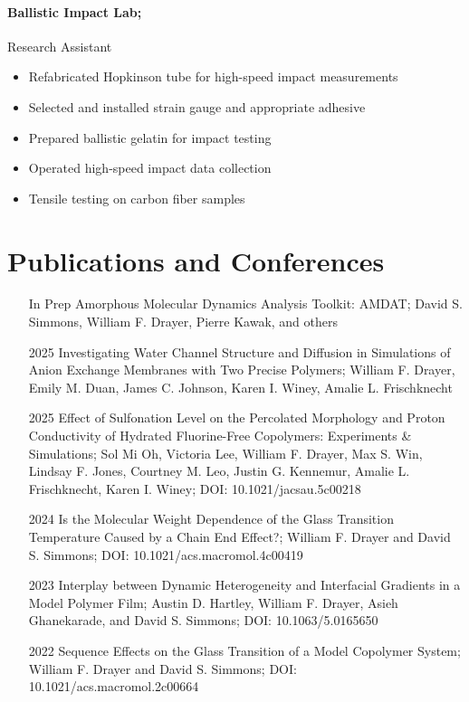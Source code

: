 \documentclass{my_cv}
\begin{document}
\paragraph{Ballistic Impact Lab;}
Research Assistant
\begin{itemize}
    \item Re\-fabricated Hopkins\-on tube for high-speed impact measurements
    \item Selected and installed strain gauge and appropriate adhesive
    \item Prepared ballistic gelatin for impact testing
    \item Operated high-speed impact data collection
    \item Tensile testing on carbon fiber samples
\end{itemize}

\section{Publications and Conferences}
\begin{itemize}
    \item[In Prep] Amorphous Molecular Dynamics Analysis Toolkit: AMDAT; 
    David S. Simmons, William F. Drayer, Pierre Kawak, and others
    \item[2025] Investigating Water Channel Structure and Diffusion in Simulations of Anion Exchange Membranes with Two Precise Polymers; 
    William F. Drayer, Emily M. Duan, James C. Johnson, Karen I. Winey, Amalie L. Frischknecht
    \item[2025] Effect of Sulfonation Level on the Percolated Morphology and Proton Conductivity of Hydrated Fluorine-Free Copolymers: 
    Experiments \& Simulations; 
    Sol Mi Oh, Victoria Lee, William F. Drayer, Max S. Win, Lindsay F. Jones, Courtney M. Leo, Justin G. Kennemur, Amalie L. Frischknecht, Karen I. Winey;
    DOI: 10.1021/jacsau.5c00218
    \item[2024] Is the Molecular Weight Dependence of the Glass Transition Temperature Caused by a Chain End Effect?;
    William F. Drayer and David S. Simmons; DOI: 10.1021/acs.macromol.4c00419
    \item[2023] Interplay between Dynamic Heterogeneity and Inter\-facial Gradients in a Model Polymer Film; 
    Austin D. Hartley, William F. Drayer, Asieh Ghanekarade, and David S. Simmons; DOI: 10.1063/5.0165650
    \item[2022] Sequence Effects on the Glass Transition of a Model Co\-polymer System; 
    William F. Drayer and David S. Simmons; 
    DOI: 10.1021/acs.macromol.2c00664
\end{itemize}
\end{document}

